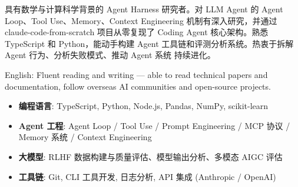 \documentclass[zh]{resume}
\begin{document}
\begin{tcolorbox}[colback=accentcolor!12, colframe=accentcolor!20,
  arc=0pt, boxrule=0.3pt, left=6pt, right=6pt, top=3pt, bottom=3pt,
  sharp corners]
\makeheader
\end{tcolorbox}

\vspace{0.3em}

具有数学与计算科学背景的 Agent Harness 研究者。对 LLM Agent 的 Agent Loop、Tool Use、Memory、Context
Engineering 机制有深入研究，并通过 claude-code-from-scratch 项目从零复现了 Coding Agent 核心架构。熟悉
TypeScript 和 Python，能动手构建 Agent 工具链和评测分析系统。热衷于拆解 Agent 行为、分析失败模式、推动 Agent 系统
持续进化。
\par\vspace{0.3ex}
English: Fluent reading and writing — able to read technical papers and documentation,
follow overseas AI communities and open-source projects.

\begin{itemize}
    \item \textbf{编程语言}: TypeScript, Python, Node.js, Pandas, NumPy, scikit-learn
    \item \textbf{Agent 工程}: Agent Loop / Tool Use / Prompt Engineering / MCP 协议 / Memory 系统 / Context Engineering
    \item \textbf{大模型}: RLHF 数据构建与质量评估、模型输出分析、多模态 AIGC 评估
    \item \textbf{工具链}: Git, CLI 工具开发, 日志分析, API 集成 (Anthropic / OpenAI)
\end{itemize}
\end{document}
